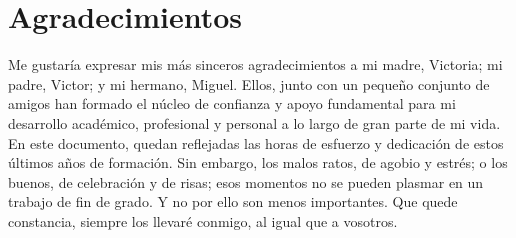 \chapter*{Agradecimientos}

Me gustaría expresar mis más sinceros agradecimientos a mi madre, Victoria; mi padre, Victor; y mi hermano, Miguel. Ellos, junto con un pequeño conjunto de amigos han formado el núcleo de confianza y apoyo fundamental para mi desarrollo académico, profesional y personal a lo largo de gran parte de mi vida. En este documento, quedan reflejadas las horas de esfuerzo y dedicación de estos últimos años de formación. Sin embargo, los malos ratos, de agobio y estrés; o los buenos, de celebración y de risas; esos momentos no se pueden plasmar en un trabajo de fin de grado. Y no por ello son menos importantes. Que quede constancia, siempre los llevaré conmigo, al igual que a vosotros.